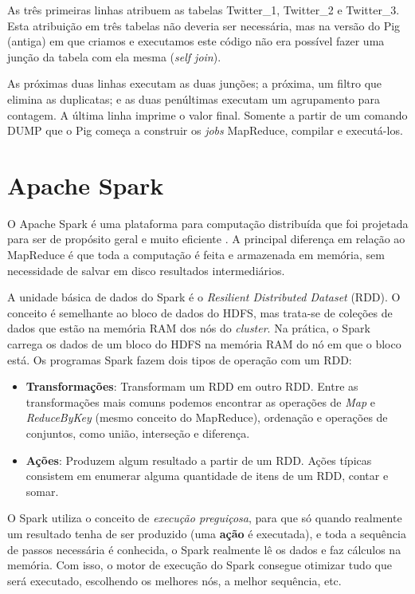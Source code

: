 As três primeiras linhas atribuem as tabelas Twitter\_1, Twitter\_2 e Twitter\_3. Esta atribuição 
em três tabelas não deveria ser necessária, mas na versão do Pig (antiga) em que criamos e executamos
este código não era possível fazer uma junção da tabela com ela mesma (\emph{self join}).

As próximas duas linhas executam as duas junções; a próxima, um filtro que elimina as duplicatas;
e as duas penúltimas executam um agrupamento para contagem. A última linha imprime o valor final.
Somente a partir de um comando DUMP que o Pig começa a construir os \textit{jobs} MapReduce, compilar
e executá-los.

\section{Apache Spark}

O Apache Spark é uma plataforma para computação distribuída que foi projetada para ser de propósito 
geral e muito eficiente \cite{zaharia2012resilient, karau2015learning}. A principal diferença em 
relação ao MapReduce é que toda a computação é feita e armazenada em memória, sem necessidade de salvar 
em disco resultados intermediários. 

A unidade básica de dados do Spark é o \textit{Resilient Distributed Dataset} (RDD). O conceito é 
semelhante ao bloco de dados do HDFS, mas trata-se de coleções de dados que estão na memória RAM dos 
nós do \textit{cluster}. Na prática, o Spark carrega os dados de um bloco do HDFS na memória RAM do nó 
em que o bloco está. Os programas Spark fazem dois tipos de operação com um RDD:

\begin{itemize}
	\item \textbf{Transformações}: Transformam um RDD em outro RDD. Entre as transformações mais 
comuns podemos encontrar as operações de \textit{Map} e \textit{ReduceByKey} (mesmo conceito do MapReduce), 
ordenação e operações de conjuntos, como união, interseção e diferença.
	\item \textbf{Ações}: Produzem algum resultado a partir de um RDD. Ações típicas consistem em 
enumerar alguma quantidade de itens de um RDD, contar e somar. 
\end{itemize}

O Spark utiliza o conceito de \emph{execução preguiçosa}, para que só quando realmente um resultado 
tenha de ser produzido (uma \textbf{ação} é executada), e toda a sequência de passos necessária é 
conhecida, o Spark realmente lê os dados e faz cálculos na memória. Com isso, o motor de execução do 
Spark consegue otimizar tudo que será executado, escolhendo os melhores nós, a melhor sequência, etc.

